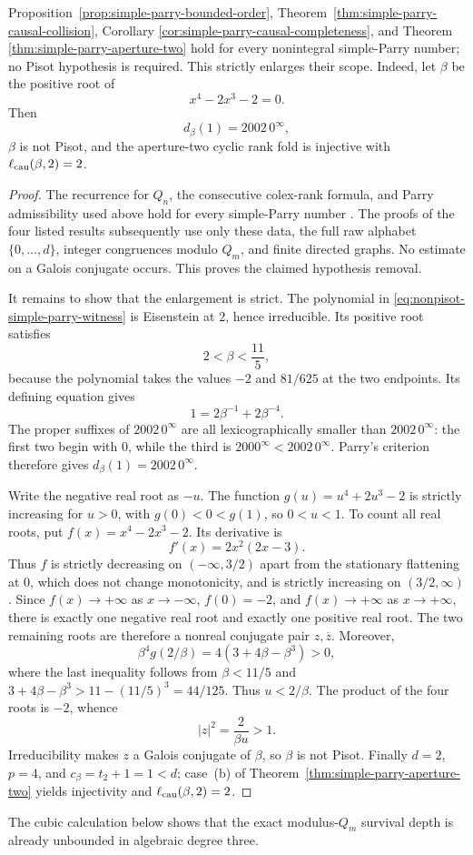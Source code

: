 \begin{proposition}
\label{prop:nonpisot-simple-parry-scope}
Proposition~\ref{prop:simple-parry-bounded-order},
Theorem~\ref{thm:simple-parry-causal-collision}, Corollary
\ref{cor:simple-parry-causal-completeness}, and Theorem
\ref{thm:simple-parry-aperture-two} hold for every nonintegral simple-Parry
number; no Pisot hypothesis is required.  This strictly enlarges their scope.
Indeed, let $\beta$ be the positive root of
\begin{equation}
x^4-2x^3-2=0.
\label{eq:nonpisot-simple-parry-witness}
\end{equation}
Then
\[
d_\beta(1)=2002\,0^\infty,
\]
$\beta$ is not Pisot, and the aperture-two cyclic rank fold is injective with
$\ell_{\rm cau}(\beta,2)=2$.
\end{proposition}

\begin{proof}
The recurrence for $Q_n$, the consecutive colex-rank formula, and Parry
admissibility used above hold for every simple-Parry number
\cite{Parry1960,CharlierCisterninoStipulanti2022}.  The proofs of the four
listed results subsequently use only these data, the full raw alphabet
$\{0,\ldots,d\}$, integer congruences modulo $Q_m$, and finite directed
graphs.  No estimate on a Galois conjugate occurs.  This proves the claimed
hypothesis removal.

It remains to show that the enlargement is strict.  The polynomial in
\eqref{eq:nonpisot-simple-parry-witness} is Eisenstein at $2$, hence
irreducible.  Its positive root satisfies
\[
2<\beta<\frac{11}{5},
\]
because the polynomial takes the values $-2$ and $81/625$ at the two
endpoints.  Its defining equation gives
\[
1=2\beta^{-1}+2\beta^{-4}.
\]
The proper suffixes of $2002\,0^\infty$ are all lexicographically smaller
than $2002\,0^\infty$: the first two begin with $0$, while the third is
$2000^\infty<2002\,0^\infty$.  Parry's criterion therefore gives
$d_\beta(1)=2002\,0^\infty$.

Write the negative real root as $-u$.  The function
$g(u)=u^4+2u^3-2$ is strictly increasing for $u>0$, with $g(0)<0<g(1)$,
so $0<u<1$.  To count all real roots, put
$f(x)=x^4-2x^3-2$.  Its derivative is
\[
f'(x)=2x^2(2x-3).
\]
Thus $f$ is strictly decreasing on $(-\infty,3/2)$ apart from the stationary
flattening at $0$, which does not change monotonicity, and is strictly
increasing on $(3/2,\infty)$.  Since $f(x)\to+\infty$ as
$x\to-\infty$, $f(0)=-2$, and $f(x)\to+\infty$ as $x\to+\infty$, there is
exactly one negative real root and exactly one positive real root.  The two
remaining roots are therefore a nonreal conjugate pair $z,\overline z$.
Moreover,
\[
\beta^4 g(2/\beta)
=4(3+4\beta-\beta^3)>0,
\]
where the last inequality follows from
$\beta<11/5$ and
$3+4\beta-\beta^3>11-(11/5)^3=44/125$.
Thus $u<2/\beta$.  The product of the four roots is $-2$, whence
\[
|z|^2=\frac{2}{\beta u}>1.
\]
Irreducibility makes $z$ a Galois conjugate of $\beta$, so $\beta$ is not
Pisot.  Finally $d=2$, $p=4$, and
$c_\beta=t_2+1=1<d$; case~\textup{(b)} of
Theorem~\ref{thm:simple-parry-aperture-two} yields injectivity and
$\ell_{\rm cau}(\beta,2)=2$.
\end{proof}

The cubic calculation below shows that the exact modulus-$Q_m$ survival depth
is already unbounded in algebraic degree three.



\ifdefined\IncludeSupplementaryConsequences

\fi
